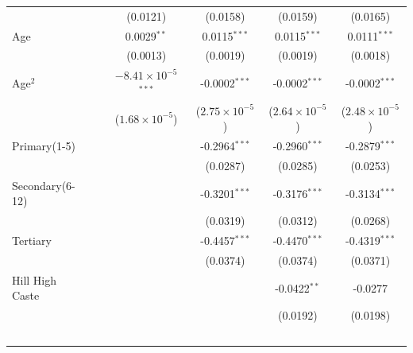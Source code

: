 \begin{tabular}{lccccc}
                                                           &                 & (0.0121)                       & (0.0158)                & (0.0159)                & (0.0165)\\   
   Age                                                     &                 & 0.0029$^{**}$                  & 0.0115$^{***}$          & 0.0115$^{***}$          & 0.0111$^{***}$\\   
                                                           &                 & (0.0013)                       & (0.0019)                & (0.0019)                & (0.0018)\\   
   Age$^2$                                            &                 & $-8.41\times 10^{-5}$$^{***}$  & -0.0002$^{***}$         & -0.0002$^{***}$         & -0.0002$^{***}$\\   
                                                           &                 & ($1.68\times 10^{-5}$)         & ($2.75\times 10^{-5}$)  & ($2.64\times 10^{-5}$)  & ($2.48\times 10^{-5}$)\\    
   Primary(1-5)                 &                 &                                & -0.2964$^{***}$         & -0.2960$^{***}$         & -0.2879$^{***}$\\   
                                                           &                 &                                & (0.0287)                & (0.0285)                & (0.0253)\\   
   Secondary(6-12)              &                 &                                & -0.3201$^{***}$         & -0.3176$^{***}$         & -0.3134$^{***}$\\   
                                                           &                 &                                & (0.0319)                & (0.0312)                & (0.0268)\\   
   Tertiary                     &                 &                                & -0.4457$^{***}$         & -0.4470$^{***}$         & -0.4319$^{***}$\\   
                                                           &                 &                                & (0.0374)                & (0.0374)                & (0.0371)\\   
   Hill High Caste                          &                 &                                &                         & -0.0422$^{**}$          & -0.0277\\   
                                                           &                 &                                &                         & (0.0192)                & (0.0198)\\   
$$
\end{tabular}
